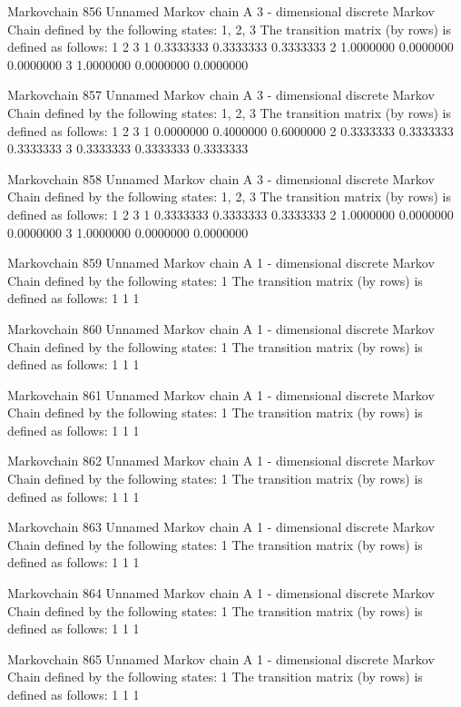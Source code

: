 \documentclass[
  nojss]{jss}
\begin{document}
\begin{CodeChunk}
\begin{CodeOutput}
Markovchain  856 
Unnamed Markov chain 
 A  3 - dimensional discrete Markov Chain defined by the following states: 
 1, 2, 3 
 The transition matrix  (by rows)  is defined as follows: 
          1         2         3
1 0.3333333 0.3333333 0.3333333
2 1.0000000 0.0000000 0.0000000
3 1.0000000 0.0000000 0.0000000

Markovchain  857 
Unnamed Markov chain 
 A  3 - dimensional discrete Markov Chain defined by the following states: 
 1, 2, 3 
 The transition matrix  (by rows)  is defined as follows: 
          1         2         3
1 0.0000000 0.4000000 0.6000000
2 0.3333333 0.3333333 0.3333333
3 0.3333333 0.3333333 0.3333333

Markovchain  858 
Unnamed Markov chain 
 A  3 - dimensional discrete Markov Chain defined by the following states: 
 1, 2, 3 
 The transition matrix  (by rows)  is defined as follows: 
          1         2         3
1 0.3333333 0.3333333 0.3333333
2 1.0000000 0.0000000 0.0000000
3 1.0000000 0.0000000 0.0000000

Markovchain  859 
Unnamed Markov chain 
 A  1 - dimensional discrete Markov Chain defined by the following states: 
 1 
 The transition matrix  (by rows)  is defined as follows: 
  1
1 1

Markovchain  860 
Unnamed Markov chain 
 A  1 - dimensional discrete Markov Chain defined by the following states: 
 1 
 The transition matrix  (by rows)  is defined as follows: 
  1
1 1

Markovchain  861 
Unnamed Markov chain 
 A  1 - dimensional discrete Markov Chain defined by the following states: 
 1 
 The transition matrix  (by rows)  is defined as follows: 
  1
1 1

Markovchain  862 
Unnamed Markov chain 
 A  1 - dimensional discrete Markov Chain defined by the following states: 
 1 
 The transition matrix  (by rows)  is defined as follows: 
  1
1 1

Markovchain  863 
Unnamed Markov chain 
 A  1 - dimensional discrete Markov Chain defined by the following states: 
 1 
 The transition matrix  (by rows)  is defined as follows: 
  1
1 1

Markovchain  864 
Unnamed Markov chain 
 A  1 - dimensional discrete Markov Chain defined by the following states: 
 1 
 The transition matrix  (by rows)  is defined as follows: 
  1
1 1

Markovchain  865 
Unnamed Markov chain 
 A  1 - dimensional discrete Markov Chain defined by the following states: 
 1 
 The transition matrix  (by rows)  is defined as follows: 
  1
1 1


\end{CodeOutput}
\end{CodeChunk}
\end{document}
